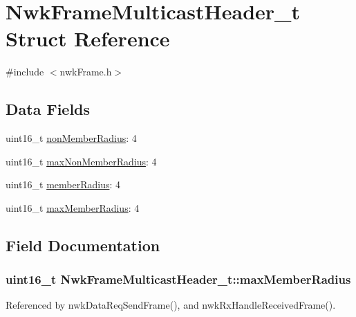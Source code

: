 \hypertarget{struct_nwk_frame_multicast_header__t}{\section{Nwk\-Frame\-Multicast\-Header\-\_\-t Struct Reference}
\label{struct_nwk_frame_multicast_header__t}
}


{\ttfamily \#include $<$nwk\-Frame.\-h$>$}

\subsection*{Data Fields}
\begin{DoxyCompactItemize}
\item 
uint16\-\_\-t \hyperlink{struct_nwk_frame_multicast_header__t_ae345f9729f9f70acb56384c58b74d7fe}{non\-Member\-Radius}\-: 4
\item 
uint16\-\_\-t \hyperlink{struct_nwk_frame_multicast_header__t_ad93a788fcf5ef8690deb6681406ddde7}{max\-Non\-Member\-Radius}\-: 4
\item 
uint16\-\_\-t \hyperlink{struct_nwk_frame_multicast_header__t_abfc3e12c48cebacbe72f2db5f812fd71}{member\-Radius}\-: 4
\item 
uint16\-\_\-t \hyperlink{struct_nwk_frame_multicast_header__t_acc3e739b6ab868df1fb4e4d0ee20fa77}{max\-Member\-Radius}\-: 4
\end{DoxyCompactItemize}


\subsection{Field Documentation}
\hypertarget{struct_nwk_frame_multicast_header__t_acc3e739b6ab868df1fb4e4d0ee20fa77}{
\subsubsection[{max\-Member\-Radius}]{\setlength{\rightskip}{0pt plus 5cm}uint16\-\_\-t Nwk\-Frame\-Multicast\-Header\-\_\-t\-::max\-Member\-Radius}}\label{struct_nwk_frame_multicast_header__t_acc3e739b6ab868df1fb4e4d0ee20fa77}


Referenced by nwk\-Data\-Req\-Send\-Frame(), and nwk\-Rx\-Handle\-Received\-Frame().

